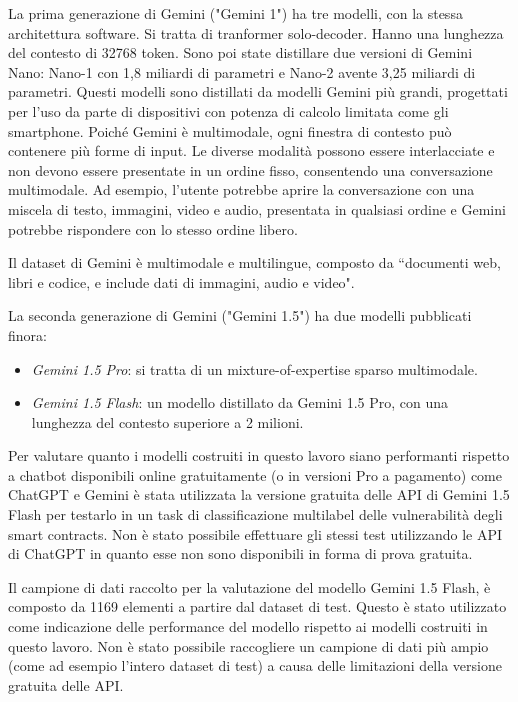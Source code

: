 \documentclass[../../Thesis.tex]{subfiles}
\begin{document}
La prima generazione di Gemini ("Gemini 1") ha tre modelli, con la stessa architettura software. Si tratta di tranformer solo-decoder. Hanno una lunghezza del contesto di 32768 token. Sono poi state distillare due versioni di Gemini Nano: Nano-1 con 1,8 miliardi di parametri e Nano-2 avente 3,25 miliardi di parametri. Questi modelli sono distillati da modelli Gemini più grandi, progettati per l'uso da parte di dispositivi con potenza di calcolo limitata come gli smartphone. Poiché Gemini è multimodale, ogni finestra di contesto può contenere più forme di input. Le diverse modalità possono essere interlacciate e non devono essere presentate in un ordine fisso, consentendo una conversazione multimodale. Ad esempio, l'utente potrebbe aprire la conversazione con una miscela di testo, immagini, video e audio, presentata in qualsiasi ordine e Gemini potrebbe rispondere con lo stesso ordine libero.

Il dataset di Gemini è multimodale e multilingue, composto da ``documenti web, libri e codice, e include dati di immagini, audio e video".

La seconda generazione di Gemini ("Gemini 1.5") ha due modelli pubblicati finora:
\begin{itemize}
    \item \emph{Gemini 1.5 Pro}: si tratta di un mixture-of-expertise sparso multimodale.
    \item \emph{Gemini 1.5 Flash}: un modello distillato da Gemini 1.5 Pro, con una lunghezza del contesto superiore a 2 milioni.
\end{itemize}


Per valutare quanto i modelli costruiti in questo lavoro siano performanti rispetto a chatbot disponibili online gratuitamente (o in versioni Pro a pagamento) come ChatGPT e Gemini è stata utilizzata la versione gratuita delle API di Gemini 1.5 Flash per testarlo in un task di classificazione multilabel delle vulnerabilità degli smart contracts. Non è stato possibile effettuare gli stessi test utilizzando le API di ChatGPT in quanto esse non sono disponibili in forma di prova gratuita.

Il campione di dati raccolto per la valutazione del modello Gemini 1.5 Flash, è composto da 1169 elementi a  partire dal dataset di test. Questo è stato utilizzato come indicazione delle performance del modello rispetto ai modelli costruiti in questo lavoro. Non è stato possibile raccogliere un campione di dati più ampio (come ad esempio l'intero dataset di test) a causa delle limitazioni della versione gratuita delle API. 
\end{document}
